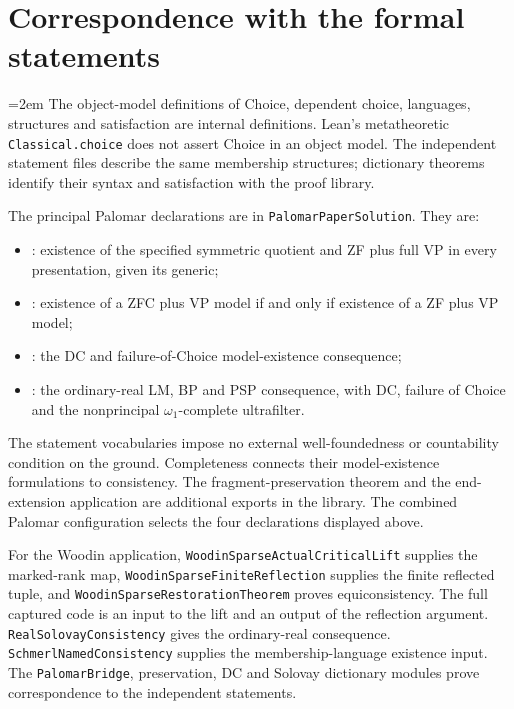 \documentclass[11pt,a4paper]{amsart}
\begin{document}
\clearpage
\section{Correspondence with the formal statements}
\emergencystretch=2em
The object-model definitions of Choice, dependent choice, languages, structures and satisfaction are internal definitions. Lean's metatheoretic \texttt{Classical.choice} does not assert Choice in an object model. The independent statement files describe the same membership structures; dictionary theorems identify their syntax and satisfaction with the proof library.

The principal Palomar declarations are in \texttt{PalomarPaperSolution}. They are:
\begin{itemize}
\item {}: existence of the specified symmetric quotient and ZF plus full VP in every presentation, given its generic;
\item {}: existence of a ZFC plus VP model if and only if existence of a ZF plus VP model;
\item {}: the DC and failure-of-Choice model-existence consequence;
\item {}: the ordinary-real LM, BP and PSP consequence, with DC, failure of Choice and the nonprincipal $\omega_1$-complete ultrafilter.
\end{itemize}
The statement vocabularies impose no external well-foundedness or countability condition on the ground. Completeness connects their model-existence formulations to consistency. The fragment-preservation theorem and the end-extension application are additional exports in the library. The combined Palomar configuration selects the four declarations displayed above.

For the Woodin application, \texttt{Woodin\allowbreak Sparse\allowbreak Actual\allowbreak Critical\allowbreak Lift} supplies the marked-rank map, \texttt{Woodin\allowbreak Sparse\allowbreak Finite\allowbreak Reflection} supplies the finite reflected tuple, and \texttt{Woodin\allowbreak Sparse\allowbreak Restoration\allowbreak Theorem} proves equiconsistency. The full captured code is an input to the lift and an output of the reflection argument. \texttt{Real\allowbreak Solovay\allowbreak Consistency} gives the ordinary-real consequence. \texttt{Schmerl\allowbreak Named\allowbreak Consistency} supplies the membership-language existence input. The \texttt{PalomarBridge}, preservation, DC and Solovay dictionary modules prove correspondence to the independent statements.
\end{document}
